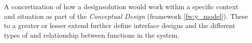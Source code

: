 \begin{tool} \label{tool:concrete_scenario} 
  A concretization of how a designsolution would work within a specific context and situation as part of the \emph{Conceptual Design} (framework \ref{fw:y_model}). These to a greater or lesser extend further define interface designs and the different types of and relationship between functions in the system. \cite[p. 64]{benyon_14}
\end{tool}